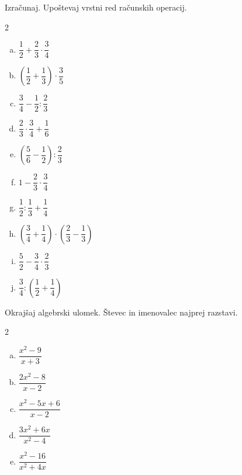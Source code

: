 \documentclass[a4paper,12pt]{letter}
\begin{document}
\begin{naloga}
Izra\v{c}unaj. Upo\v{s}tevaj vrstni red ra\v{c}unskih operacij.

\begin{multicols}{2}
\begin{enumerate}[a.)]
\item $\dfrac{1}{2}+\dfrac{2}{3}\cdot\dfrac{3}{4}$
\item $\left(\dfrac{1}{2}+\dfrac{1}{3}\right)\cdot\dfrac{3}{5}$
\item $\dfrac{3}{4}-\dfrac{1}{2}:\dfrac{2}{3}$
\item $\dfrac{2}{3}\cdot\dfrac{3}{4}+\dfrac{1}{6}$
\item $\left(\dfrac{5}{6}-\dfrac{1}{2}\right):\dfrac{2}{3}$
\item $1-\dfrac{2}{3}\cdot\dfrac{3}{4}$
\item $\dfrac{1}{2}:\dfrac{1}{3}+\dfrac{1}{4}$
\item $\left(\dfrac{3}{4}+\dfrac{1}{4}\right)\cdot\left(\dfrac{2}{3}-\dfrac{1}{3}\right)$
\item $\dfrac{5}{2}-\dfrac{3}{4}\cdot\dfrac{2}{3}$
\item $\dfrac{3}{4}:\left(\dfrac{1}{2}+\dfrac{1}{4}\right)$
\end{enumerate}
\end{multicols}
\end{naloga}
\begin{naloga}
Okraj\v{s}aj algebrski ulomek. \v{S}tevec in imenovalec najprej razstavi.

\begin{multicols}{2}
\begin{enumerate}[a.)]
\item $\dfrac{x^2-9}{x+3}$
\item $\dfrac{2x^2-8}{x-2}$
\item $\dfrac{x^2-5x+6}{x-2}$
\item $\dfrac{3x^2+6x}{x^2-4}$
\item $\dfrac{x^2-16}{x^2+4x}$
\end{enumerate}
\end{multicols}
\end{naloga}
\end{document}
